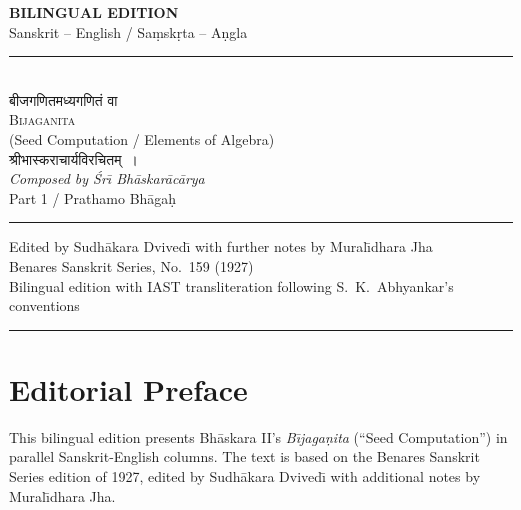 \documentclass[11pt,a4paper]{article}
\newcommand{\longline}{\noindent\rule{\textwidth}{0.4pt}}
\newcommand{\shortline}{\noindent\rule{0.5\textwidth}{0.4pt}\par}
\begin{document}
\thispagestyle{empty}
\begin{center}
\vspace*{1.5cm}
{\LARGE\bfseries BILINGUAL EDITION}\\[0.3cm]
{\large Sanskrit -- English / Sa\d{m}sk\d{r}ta -- A\d{n}gla}\\[0.5cm]
\longline\\[0.4cm]
{\Huge\devanagarifont बीजगणितमध्यगणितं वा}\\[0.3cm]
{\LARGE\scshape Bijaganita}\\[0.2cm]
{\normalsize (Seed Computation / Elements of Algebra)}\\[0.4cm]
{\large\devanagarifont श्रीभास्कराचार्यविरचितम्~।}\\[0.3cm]
{\large\itshape Composed by \'{S}r\={\i} Bh\={a}skar\={a}c\={a}rya}\\[0.6cm]
{\large Part 1 / Prathamo Bh\={a}ga\d{h}}\\[0.3cm]
\shortline
{\normalsize Edited by Sudh\={a}kara Dvived\={\i} with further notes by Mural\={\i}dhara Jha}\\[0.2cm]
{\small Benares Sanskrit Series, No.~159 (1927)}\\[0.3cm]
{\footnotesize Bilingual edition with IAST transliteration following S.~K.~Abhyankar's conventions}\\[0.5cm]
\longline
\end{center}
\clearpage

\thispagestyle{empty}
\section*{Editorial Preface}

This bilingual edition presents Bh\={a}skara II's \textit{B\={\i}jaga\d{n}ita} (``Seed Computation'') in parallel Sanskrit-English columns. The text is based on the Benares Sanskrit Series edition of 1927, edited by Sudh\={a}kara Dvived\={\i} with additional notes by Mural\={\i}dhara Jha.
\end{document}
